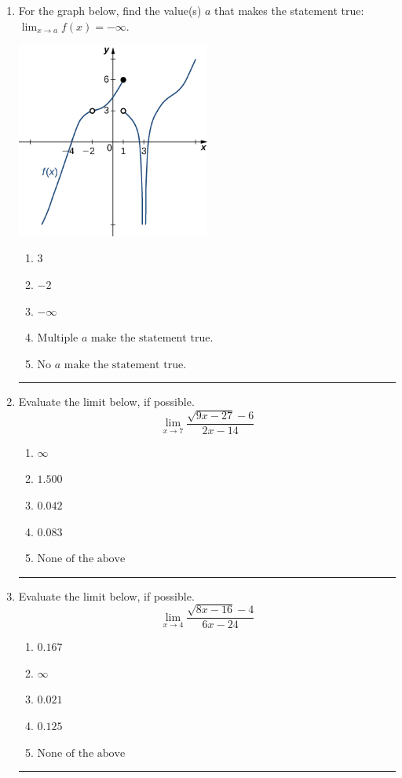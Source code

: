 \documentclass[14pt]{extbook}
\newcommand{\litem}[1]{\item#1\hspace*{-1cm}\rule{\textwidth}{0.4pt}}
\begin{document}
\begin{enumerate}
{\begin{enumerate}[label=\Alph*.]
\end{enumerate} }
\litem{
For the graph below, find the value(s) $a$ that makes the statement true: $ \displaystyle \lim_{x \rightarrow a} f(x) = -\infty$.
\begin{center}
    \includegraphics[width=0.5\textwidth]{../Figures/evaluateLimitGraphicallyCopyB.png}
\end{center}
\begin{enumerate}[label=\Alph*.]
\item \( 3 \)
\item \( -2 \)
\item \( -\infty \)
\item \( \text{Multiple } a \text{ make the statement true}. \)
\item \( \text{No } a \text{ make the statement true}. \)

\end{enumerate} }
\litem{
Evaluate the limit below, if possible.\[ \lim_{x \rightarrow 7} \frac{\sqrt{9x - 27} - 6}{2x - 14} \]\begin{enumerate}[label=\Alph*.]
\item \( \infty \)
\item \( 1.500 \)
\item \( 0.042 \)
\item \( 0.083 \)
\item \( \text{None of the above} \)

\end{enumerate} }
\litem{
Evaluate the limit below, if possible.\[ \lim_{x \rightarrow 4} \frac{\sqrt{8x - 16} - 4}{6x - 24} \]\begin{enumerate}[label=\Alph*.]
\item \( 0.167 \)
\item \( \infty \)
\item \( 0.021 \)
\item \( 0.125 \)
\item \( \text{None of the above} \)


\end{enumerate}}
\end{enumerate}
\end{document}
